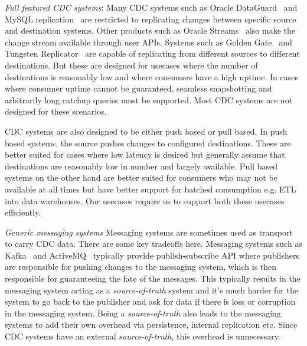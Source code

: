 \begin{itemize*}
\item \emph{Full featured CDC systems}: Many CDC systems such as Oracle DataGuard~\cite{dataguard} and MySQL replication~\cite{mysqlrepl} are restricted to replicating changes between specific source and destination systems. Other products such as Oracle Streams~\cite{streams} also make the change stream available through user APIs. Systems such as Golden Gate~\cite{goldengate} and Tungsten Replicator~\cite{tungsten} are capable of replicating from different sources to different destinations. But these are designed for usecases where the number of destinations is reasonably low and where consumers have a high uptime. In cases where consumer uptime cannot be guaranteed, seamless snapshotting and arbitrarily long catchup queries must be supported. Most CDC systems are not designed for these scenarios.
 
CDC systems are also designed to be either push based or pull based. In push based systems, the source pushes changes to configured destinations. These are better suited for cases where low latency is desired but generally assume that destinations are reasonably low in number and largely available. Pull based systems on the other hand are better suited for consumers who may not be available at all times but have better support for batched consumption e.g. ETL into data warehouses.
Our usecases require us to support both these usecases efficiently.

\item \emph{Generic messaging systems}
Messaging systems are sometimes used as transport to carry CDC data. There are some key tradeoffs here. Messaging systems such as Kafka~\cite{kafka} and ActiveMQ~\cite{activemq} typically provide publish-subscribe API where publishers are responsible for pushing changes to the messaging system, which is then responsible for guaranteeing the fate of the messages. This typically results in the messaging system acting as a \emph{source-of-truth} system and it's much harder for the system to go back to the publisher and ask for data if there is loss or corruption in the messaging system. Being a \emph{source-of-truth} also leads to the messaging systems to add their own overhead via persistence, internal replication etc. Since CDC systems have an external \emph{source-of-truth}, this overhead is unnecessary.
\end{itemize*}

